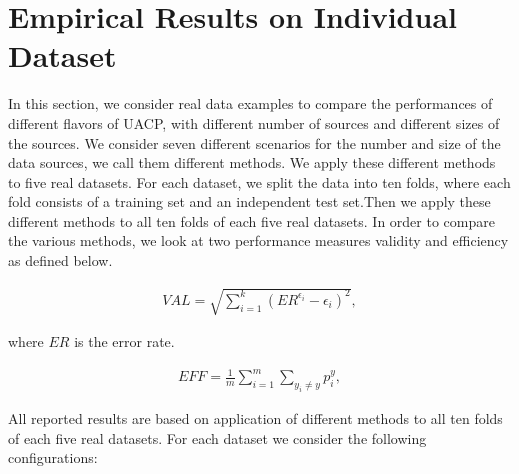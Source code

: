\documentclass[main]{subfiles}
\begin{document}
\section*{Empirical Results on Individual Dataset}\label{sec:results}
In this section, we consider real data examples to compare the performances of different flavors of UACP, with different number of sources and different sizes of the sources. We consider seven different scenarios for the number and size of the data sources, we call them different methods.  We apply these different methods to five real datasets. For each dataset, we split the data into ten folds, where each fold consists of a training set and an independent test set.Then we apply these different methods to all ten folds of each five real datasets. In order to compare the various methods, we look at two performance measures validity  and efficiency as defined below. 
\begin{definition}[Validity]
\begin{align} \label{eq:validity}
		VAL = \sqrt{ \sum\limits_{i=1}^{k} (ER^{\epsilon_i} -\epsilon_i)^2 },
\end{align}	 
\end{definition}
where $ER$ is the error rate.
\begin{definition}[Efficiency]
\begin{align} \label{eq:efficiency}
	EFF =\frac{ 1}{m} \sum\limits_{i=1}^{m} \sum\limits_{y_i \neq y }  p_i^y,		
\end{align}
\end{definition}

All reported results are based on application of different methods to all ten folds of each five real datasets. For each dataset we consider the following configurations:
\end{document}
